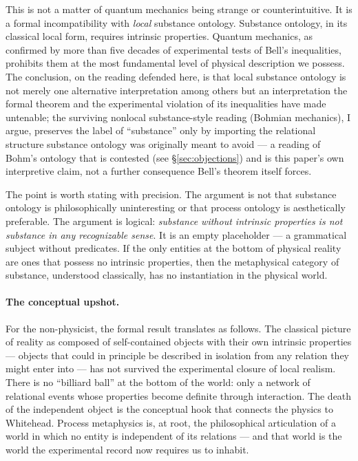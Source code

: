 This is not a matter of quantum mechanics being strange or counterintuitive.
It is a formal incompatibility with \emph{local} substance ontology.
Substance ontology, in its classical local form, requires intrinsic
properties.
Quantum mechanics, as confirmed by more than five decades of experimental tests of
Bell's inequalities, prohibits them at the most fundamental level of
physical description we possess.
The conclusion, on the reading defended here, is that local substance
ontology is not merely one alternative interpretation among others but
an interpretation the formal theorem and the experimental violation of its
inequalities have made untenable; the surviving nonlocal substance-style reading
(Bohmian mechanics), I argue, preserves the label of ``substance'' only
by importing the relational structure substance ontology was originally
meant to avoid --- a reading of Bohm's ontology that is contested (see
\S\ref{sec:objections}) and is this paper's own interpretive claim, not
a further consequence Bell's theorem itself forces.

The point is worth stating with precision.
The argument is not that substance ontology is philosophically uninteresting
or that process ontology is aesthetically preferable.
The argument is logical: \emph{substance without intrinsic properties
is not substance in any recognizable sense}.
It is an empty placeholder --- a grammatical subject without predicates.
If the only entities at the bottom of physical reality are ones that possess
no intrinsic properties, then the metaphysical category of substance,
understood classically, has no instantiation in the physical world.

\paragraph{The conceptual upshot.}
For the non-physicist, the formal result translates as follows.
The classical picture of reality as composed of self-contained objects
with their own intrinsic properties --- objects that could in principle
be described in isolation from any relation they might enter into ---
has not survived the experimental closure of local realism.
There is no ``billiard ball'' at the bottom of the world: only a network
of relational events whose properties become definite through interaction.
The death of the independent object is the conceptual hook that connects
the physics to Whitehead.
Process metaphysics is, at root, the philosophical articulation of a
world in which no entity is independent of its relations --- and that
world is the world the experimental record now requires us to inhabit.

